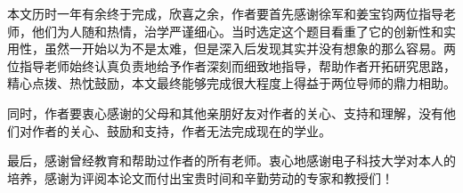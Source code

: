 
本文历时一年有余终于完成，欣喜之余，作者要首先感谢徐军和姜宝钧两位指导老师，他们为人随和热情，治学严谨细心。当时选定这个题目看重了它的创新性和实用性，虽然一开始以为不是太难，但是深入后发现其实并没有想象的那么容易。两{\cf}位指{\cf}导老{\cf}师始{\cf}终认{\cf}真负{\cf}责地{\cf}给予{\cf}作者{\cf}深刻{\cf}而细{\cf}致地{\cf}指导{\cf}，帮{\cf}助作{\cf}者开{\cf}拓研{\cf}究思{\cf}路，{\cf}精心{\cf}点拨{\cf}、热{\cf}忱鼓{\cf}励，{\cf}本文{\cf}最终{\cf}能够{\cf}完成{\cf}很大{\cf}程度{\cf}上得{\cf}益于{\cf}两位{\cf}导师{\cf}的鼎{\cf}力相{\cf}助。

同{\cf}时，{\cf}作者{\cf}要衷{\cf}心感{\cf}谢的{\cf}父母{\cf}和其{\cf}他亲{\cf}朋好{\cf}友对{\cf}作者{\cf}的关{\cf}心、{\cf}支持{\cf}和理{\cf}解，{\cf}没有{\cf}他们{\cf}对作{\cf}者的{\cf}关心{\cf}、鼓{\cf}励和{\cf}支持{\cf}，作{\cf}者无{\cf}法完{\cf}成现{\cf}在的{\cf}学业。

最{\cf}后，{\cf}感谢{\cf}曾经{\cf}教育{\cf}和帮{\cf}助过{\cf}作者{\cf}的所{\cf}有老{\cf}师。{\cf}衷心{\cf}地感{\cf}谢电{\cf}子科{\cf}技大{\cf}学对{\cf}本人{\cf}的培{\cf}养，{\cf}感谢{\cf}为评{\cf}阅本{\cf}论文{\cf}而付{\cf}出宝{\cf}贵时{\cf}间和{\cf}辛勤{\cf}劳动{\cf}的专{\cf}家和{\cf}教授{\cf}们！
